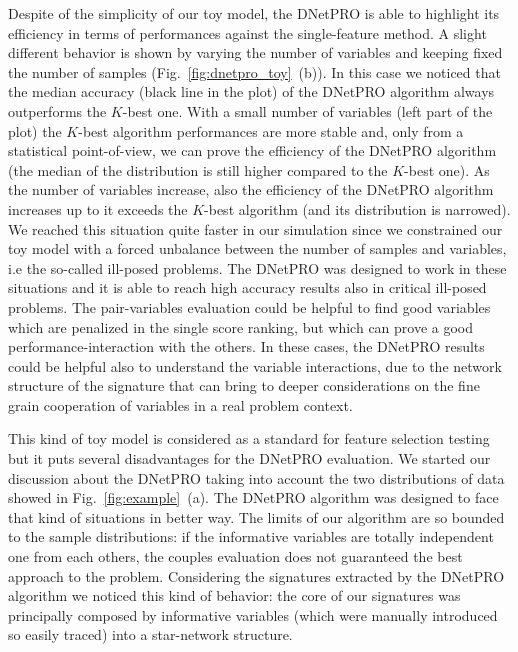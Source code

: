 \documentclass{standalone}
\begin{document}
Despite of the simplicity of our toy model, the \textsf{DNetPRO} is able to highlight its efficiency in terms of performances against the single-feature method.
A slight different behavior is shown by varying the number of variables and keeping fixed the number of samples (Fig.~\ref{fig:dnetpro_toy}~(b)).
In this case we noticed that the median accuracy (black line in the plot) of the \textsf{DNetPRO} algorithm always outperforms the $K$-best one.
With a small number of variables (left part of the plot) the $K$-best algorithm performances are more stable and, only from a statistical point-of-view, we can prove the efficiency of the \textsf{DNetPRO} algorithm (the median of the distribution is still higher compared to the $K$-best one).
As the number of variables increase, also the efficiency of the \textsf{DNetPRO} algorithm increases up to it exceeds the $K$-best algorithm (and its distribution is narrowed).
We reached this situation quite faster in our simulation since we constrained our toy model with a forced unbalance between the number of samples and variables, i.e the so-called ill-posed problems.
The \textsf{DNetPRO} was designed to work in these situations and it is able to reach high accuracy results also in critical ill-posed problems.
The pair-variables evaluation could be helpful to find good variables which are penalized in the single score ranking, but which can prove a good performance-interaction with the others.
In these cases, the \textsf{DNetPRO} results could be helpful also to understand the variable interactions, due to the network structure of the signature that can bring to deeper considerations on the fine grain cooperation of variables in a real problem context.

This kind of toy model is considered as a standard for feature selection testing but it puts several disadvantages for the \textsf{DNetPRO} evaluation.
We started our discussion about the \textsf{DNetPRO} taking into account the two distributions of data showed in Fig.~\ref{fig:example}~(a).
The \textsf{DNetPRO} algorithm was designed to face that kind of situations in better way.
The limits of our algorithm are so bounded to the sample distributions: if the informative variables are totally independent one from each others, the couples evaluation does not guaranteed the best approach to the problem.
Considering the signatures extracted by the \textsf{DNetPRO} algorithm we noticed this kind of behavior: the core of our signatures was principally composed by informative variables (which were manually introduced so easily traced) into a star-network structure.
\end{document}
